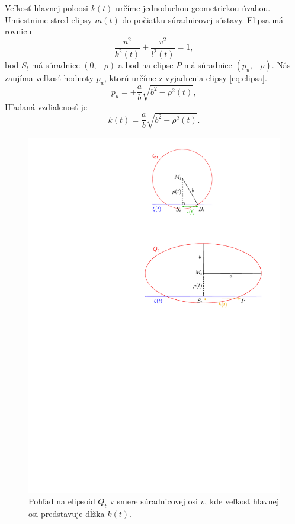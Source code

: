Veľkosť hlavnej poloosi $k(t)$ určíme jednoduchou geometrickou úvahou. Umiestnime stred elipsy $m(t)$ do počiatku súradnicovej sústavy. Elipsa má rovnicu 
\begin{equation}
\label{eq:elipsa}
\frac{u^2}{k^2(t)} + \frac{v^2}{l^2(t)} = 1,
\end{equation}
bod $S_t$ má súradnice $(0, -\rho)$ a bod na elipse $P$ má súradnice $(p_u, -\rho)$. Nás zaujíma veľkosť hodnoty $p_u$, ktorú určíme z vyjadrenia elipsy \ref{eq:elipsa}.
$$
p_u = \pm \frac{a}{b} \sqrt{b^2 - \rho^2(t)},
$$
Hľadaná vzdialenosť je $$
k(t) = \frac{a}{b} \sqrt{b^2 - \rho^2(t)}.
$$
\begin{figure}[h]
	\centering
	\includegraphics[trim={7.5cm 15cm 0 8.5cm},clip]{images/elipsa.pdf}
	\caption[Hlavná os charakteristickej elipsy.]{Pohľad na elipsoid $Q_t$ v smere súradnicovej osi $v$, kde veľkosť hlavnej osi predstavuje dĺžka $k(t).$}
	\label{fig:ellipse2}
\end{figure}
